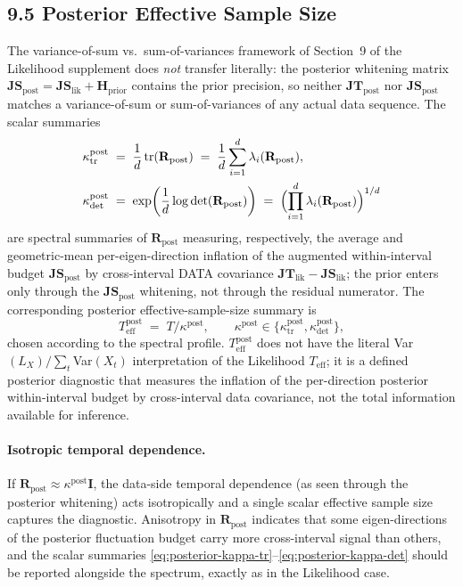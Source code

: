 \documentclass[11pt]{article}
\begin{document}
\subsection*{9.5 Posterior Effective Sample Size}

The variance-of-sum vs.\ sum-of-variances framework of Section~9 of the Likelihood supplement does \emph{not} transfer literally: the posterior whitening matrix $\mathbf{JS}_{\mathrm{post}} = \mathbf{JS}_{\mathrm{lik}} + \mathbf H_{\mathrm{prior}}$ contains the prior precision, so neither $\mathbf{JT}_{\mathrm{post}}$ nor $\mathbf{JS}_{\mathrm{post}}$ matches a variance-of-sum or sum-of-variances of any actual data sequence. The scalar summaries
\begin{align}
\kappa_{\mathrm{tr}}^{\mathrm{post}}
&\;=\;
\frac{1}{d}\,\mathrm{tr}(\mathbf R_{\mathrm{post}})
\;=\;
\frac{1}{d}\sum_{i=1}^d \lambda_i(\mathbf R_{\mathrm{post}}),
\label{eq:posterior-kappa-tr}\\
\kappa_{\mathrm{det}}^{\mathrm{post}}
&\;=\;
\exp\!\left(\frac{1}{d}\log\det(\mathbf R_{\mathrm{post}})\right)
\;=\;
\Bigl(\prod_{i=1}^d \lambda_i(\mathbf R_{\mathrm{post}})\Bigr)^{1/d}
\label{eq:posterior-kappa-det}
\end{align}
are spectral summaries of $\mathbf R_{\mathrm{post}}$ measuring, respectively, the average and geometric-mean per-eigen-direction inflation of the augmented within-interval budget $\mathbf{JS}_{\mathrm{post}}$ by cross-interval DATA covariance $\mathbf{JT}_{\mathrm{lik}} - \mathbf{JS}_{\mathrm{lik}}$; the prior enters only through the $\mathbf{JS}_{\mathrm{post}}$ whitening, not through the residual numerator. The corresponding posterior effective-sample-size summary is
\begin{equation}
T_{\mathrm{eff}}^{\mathrm{post}}
\;=\;
T / \kappa^{\mathrm{post}},
\qquad
\kappa^{\mathrm{post}} \in \{\kappa_{\mathrm{tr}}^{\mathrm{post}}, \kappa_{\mathrm{det}}^{\mathrm{post}}\},
\label{eq:posterior-teff}
\end{equation}
chosen according to the spectral profile. $T_{\mathrm{eff}}^{\mathrm{post}}$ does not have the literal Var$(L_X)/\sum_t$Var$(X_t)$ interpretation of the Likelihood $T_{\mathrm{eff}}$; it is a defined posterior diagnostic that measures the inflation of the per-direction posterior within-interval budget by cross-interval data covariance, not the total information available for inference.

\paragraph{Isotropic temporal dependence.}
If $\mathbf R_{\mathrm{post}} \approx \kappa^{\mathrm{post}} \mathbf I$, the data-side temporal dependence (as seen through the posterior whitening) acts isotropically and a single scalar effective sample size captures the diagnostic. Anisotropy in $\mathbf R_{\mathrm{post}}$ indicates that some eigen-directions of the posterior fluctuation budget carry more cross-interval signal than others, and the scalar summaries \eqref{eq:posterior-kappa-tr}--\eqref{eq:posterior-kappa-det} should be reported alongside the spectrum, exactly as in the Likelihood case.
\end{document}

